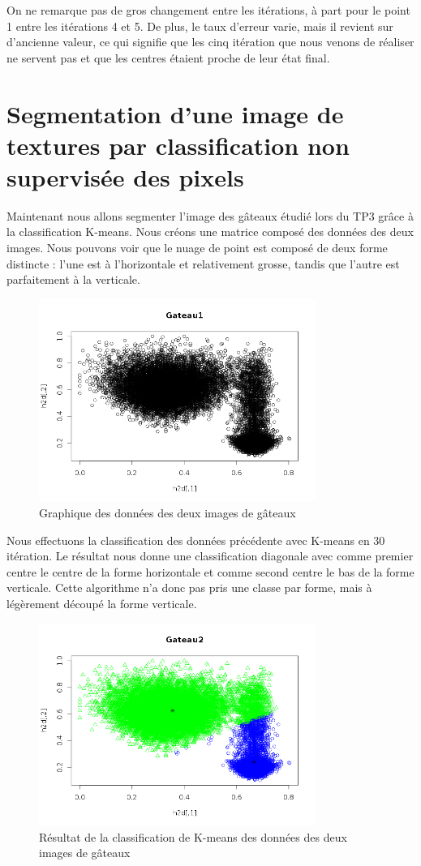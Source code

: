 \documentclass[a4paper,11pt]{article}
\begin{document}
  On ne remarque pas de gros changement entre les itérations, à part pour le point 1 entre les itérations
  4 et 5. De plus, le taux d'erreur varie, mais il revient sur d'ancienne valeur, ce qui signifie que les 
  cinq itération que nous venons de réaliser ne servent pas et que les centres étaient proche de leur 
  état final.
  
  
  
  \section{Segmentation d'une image de textures par classification non supervisée des pixels}
  Maintenant nous allons segmenter l'image des gâteaux étudié lors du TP3 grâce à la classification
  K-means. Nous créons une matrice composé des données des deux images. Nous pouvons voir que le nuage
  de point est composé de deux forme distincte : l'une est à l'horizontale et relativement grosse, tandis 
  que l'autre est parfaitement à la verticale.
  
  \begin{figure}[H]
    \center
    \includegraphics[width=9cm]{resultat/image_combine.png}
    \caption{Graphique des données des deux images de gâteaux}
  \end{figure}
  
  Nous effectuons la classification des données précédente avec K-means en 30 itération. Le résultat
  nous donne une classification diagonale avec comme premier centre le centre de la forme horizontale et 
  comme second centre le bas de la forme verticale. Cette algorithme n'a donc pas pris une classe par forme,
  mais à légèrement découpé la forme verticale.
  
  \begin{figure}[H]
    \center
    \includegraphics[width=9cm]{resultat/classification_gateau.png}
    \caption{Résultat de la classification de K-means des données des deux images de gâteaux}
  \end{figure}
  
  
\end{document}
